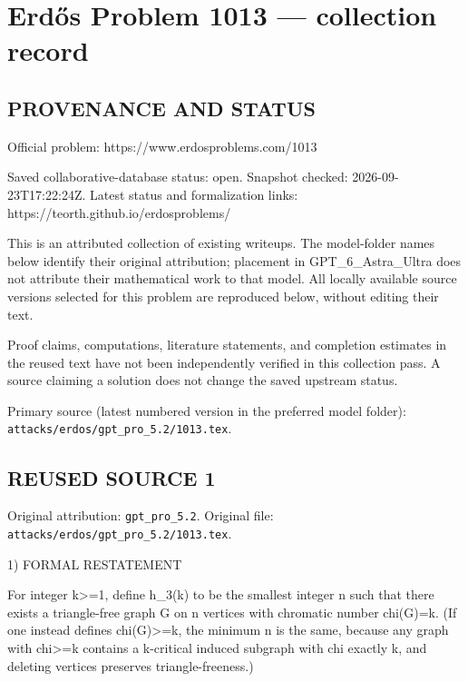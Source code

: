 \section*{Erd\H{o}s Problem 1013 --- collection record}

\subsection*{PROVENANCE AND STATUS}
Official problem: https://www.erdosproblems.com/1013

Saved collaborative-database status: open.
Snapshot checked: 2026-09-23T17:22:24Z.
Latest status and formalization links: https://teorth.github.io/erdosproblems/

This is an attributed collection of existing writeups. The model-folder names below identify their original attribution; placement in GPT\_6\_Astra\_Ultra does not attribute their mathematical work to that model. All locally available source versions selected for this problem are reproduced below, without editing their text.

Proof claims, computations, literature statements, and completion estimates in the reused text have not been independently verified in this collection pass. A source claiming a solution does not change the saved upstream status.

Primary source (latest numbered version in the preferred model folder): \texttt{attacks/erdos/gpt\_pro\_5.2/1013.tex}.

\subsection*{REUSED SOURCE 1}
Original attribution: \texttt{gpt\_pro\_5.2}.
Original file: \texttt{attacks/erdos/gpt\_pro\_5.2/1013.tex}.


1) FORMAL RESTATEMENT

For integer k>=1, define h_3(k) to be the smallest integer n such that there exists a triangle-free graph G on n vertices with chromatic number chi(G)=k.
(If one instead defines chi(G)>=k, the minimum n is the same, because any graph with chi>=k contains a k-critical induced subgraph with chi exactly k, and deleting vertices preserves triangle-freeness.)

